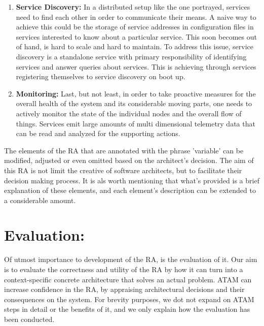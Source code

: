 \documentclass[runningheads]{llncs}
\begin{document}
\begin{enumerate}
    \item \textbf{Service Discovery:} In a distributed setup like the one portrayed, services need to find each other in order to communicate their means. A naive way to achieve this could be the storage of service addresses in configuration files in services interested to know about a particular service. This soon becomes out of hand, is hard to scale and hard to maintain. To address this issue, service discovery is a standalone service with primary responsibility of identifying services and answer queries about services. This is achieving through services registering themselves to service discovery on boot up.
    \item \textbf{Monitoring:} Last, but not least, in order to take proactive measures for the overall health of the system and its considerable moving parts, one needs to actively monitor the state of the individual nodes and the overall flow of things. Services emit large amounts of multi dimensional telemetry data that can be read and analyzed for the supporting actions. 
\end{enumerate}

The elements of the RA that are annotated with the phrase 'variable' can be modified, adjusted or even omitted based on the architect's decision. The aim of this RA is not limit the creative of software architects, but to facilitate their decision making process. It is als worth mentioning that what's provided is a brief explanation of these elements, and each element's description can be extended to a considerable amount.  

\section*{Evaluation:}

Of utmost importance to development of the RA, is the evaluation of it. Our aim is to evaluate the correctness and utility of the RA by how it can turn into a context-specific concrete architecture that solves an actual problem. ATAM can increase confidence in the RA, by appraising architectural decisions and their consequences on the system. For brevity purposes, we dot not expand on ATAM steps in detail or the benefits of it, and we only explain how the evaluation has been conducted. 



%
%



\end{document}
